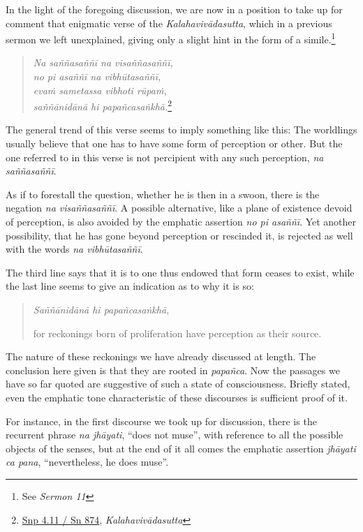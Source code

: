 In the light of the foregoing discussion, we are now in a position to take up for comment that enigmatic verse of the \emph{Kalahavivādasutta}, which in a previous sermon we left unexplained, giving only a slight hint in the form of a simile.\footnote{See \emph{Sermon 11}}

\begin{quote}
\emph{Na saññasaññī na visaññasaññī,}\\
\emph{no pi asaññī na vibhūtasaññī,}\\
\emph{evaṁ sametassa vibhoti rūpaṁ,}\\
\emph{saññānidānā hi papañcasaṅkhā.}\footnote{\href{https://suttacentral.net/snp4.11/pli/ms}{Snp 4.11 / Sn 874}, \emph{Kalahavivādasutta}}
\end{quote}

The general trend of this verse seems to imply something like this: The worldlings usually believe that one has to have some form of perception or other. But the one referred to in this verse is not percipient with any such perception, \emph{na saññasaññī}.

As if to forestall the question, whether he is then in a swoon, there is the negation \emph{na visaññasaññī}. A possible alternative, like a plane of existence devoid of perception, is also avoided by the emphatic assertion \emph{no pi asaññī}. Yet another possibility, that he has gone beyond perception or rescinded it, is rejected as well with the words \emph{na vibhūtasaññī}.

The third line says that it is to one thus endowed that form ceases to exist, while the last line seems to give an indication as to why it is so:

\begin{quote}
\emph{Saññānidānā hi papañcasaṅkhā},

for reckonings born of proliferation have perception as their source.
\end{quote}

The nature of these reckonings we have already discussed at length. The conclusion here given is that they are rooted in \emph{papañca}. Now the passages we have so far quoted are suggestive of such a state of consciousness. Briefly stated, even the emphatic tone characteristic of these discourses is sufficient proof of it.

For instance, in the first discourse we took up for discussion, there is the recurrent phrase \emph{na jhāyati}, ``does not muse'', with reference to all the possible objects of the senses, but at the end of it all comes the emphatic assertion \emph{jhāyati ca pana}, ``nevertheless, he does muse''.

